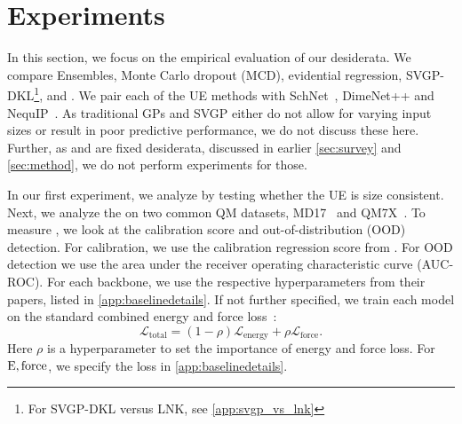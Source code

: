 \section{Experiments}
\label{sec:experiments}
In this section, we focus on the empirical evaluation of our desiderata.
We compare Ensembles, Monte Carlo dropout (MCD), evidential regression, SVGP-DKL\footnote{For SVGP-DKL versus LNK, see \autoref{app:svgp_vs_lnk}}, and \oursacro{}.
We pair each of the UE methods with SchNet~\citep{schutt2021equivariant}, DimeNet++\citep{gasteigerDirectionalMessagePassing2019,gasteigerFastUncertaintyAwareDirectional2020} and NequIP~\citep{batznerEquivariantGraphNeural2022}.
As traditional GPs and SVGP either do not allow for varying input sizes or result in poor predictive performance, we do not discuss these here.
Further, as \desone{} and \destwo{} are fixed desiderata, discussed in earlier \autoref{sec:survey} and \autoref{sec:method}, we do not perform experiments for those.

In our first experiment, we analyze \desfour{} by testing whether the UE is size consistent.
Next, we analyze the \desfive{} on two common QM datasets, MD17~\citep{chmiela2017machine} and QM7X~\citep{hojaQM7XComprehensiveDataset2021}.
To measure \dessix{}, we look at the calibration score and out-of-distribution (OOD) detection.
For calibration, we use the calibration regression score from \citet{charpentier_natural_2022}.
For OOD detection we use the area under the receiver operating characteristic curve (AUC-ROC). For each backbone, we use the respective hyperparameters from their papers, listed in \autoref{app:baselinedetails}.
If not further specified, we train each model on the standard combined energy and force loss~\citep{gasteigerDirectionalMessagePassing2019}: 
\begin{equation}
\mathcal{L}_\text{total} = (1-\rho)\mathcal{L}_\text{energy} + \rho\mathcal{L}_\text{force}.
\end{equation}
Here $\rho$ is a hyperparameter to set the importance of energy and force loss. For $\text{E}, \text{force}$, we specify the loss in \cref{app:baselinedetails}.

